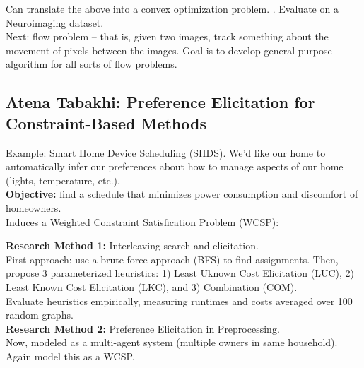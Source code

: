 Can translate the above into a convex optimization problem. . Evaluate on a Neuroimaging dataset. \\

Next: flow problem -- that is, given two images, track something about the movement of pixels between the images. Goal is to develop general purpose algorithm for all sorts of flow problems. 
\spacerule
\subsection{Atena Tabakhi: Preference Elicitation for Constraint-Based Methods}

Example: Smart Home Device Scheduling (SHDS). We'd like our home to automatically infer our preferences about how to manage aspects of our home (lights, temperature, etc.). \\

{\bf Objective:} find a schedule that minimizes power consumption and discomfort of homeowners. \\

Induces a Weighted Constraint Satisfication Problem (WCSP):


{\bf Research Method 1:} Interleaving search and elicitation. \\

First approach: use a brute force approach (BFS) to find assignments. Then, propose 3 parameterized heuristics: 1) Least Uknown Cost Elicitation (LUC), 2) Least Known Cost Elicitation (LKC), and 3) Combination (COM). \\

Evaluate heuristics empirically, measuring runtimes and costs averaged over 100 random graphs. \\

{\bf Research Method 2:} Preference Elicitation in Preprocessing. \\

Now, modeled as a multi-agent system (multiple owners in same household). Again model this as a WCSP. \\

